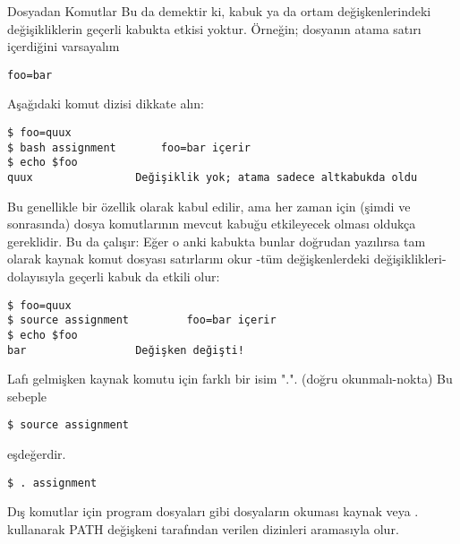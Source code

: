 \begin{section}{Dosyadan Komutlar}
Bu da demektir ki, kabuk ya da ortam değişkenlerindeki değişikliklerin geçerli kabukta etkisi yoktur. Örneğin; dosyanın atama satırı içerdiğini varsayalım
\begin{verbatim}
foo=bar
\end{verbatim}

Aşağıdaki komut dizisi dikkate alın:
\begin{verbatim}
$ foo=quux
$ bash assignment 		foo=bar içerir
$ echo $foo
quux 				Değişiklik yok; atama sadece altkabukda oldu
\end{verbatim} 

Bu genellikle bir özellik olarak kabul edilir, ama her zaman için (şimdi ve sonrasında) dosya komutlarının mevcut kabuğu etkileyecek olması oldukça gereklidir. Bu da çalışır: Eğer o anki kabukta bunlar doğrudan yazılırsa tam olarak kaynak komut dosyası satırlarını okur -tüm değişkenlerdeki değişiklikleri- dolayısıyla geçerli kabuk da etkili olur:
\begin{verbatim}
$ foo=quux
$ source assignment 		foo=bar içerir
$ echo $foo
bar 				Değişken değişti!
\end{verbatim}

Lafı gelmişken kaynak komutu için farklı bir isim ".". (doğru okunmalı-nokta) Bu sebeple
\begin{verbatim}
$ source assignment
\end{verbatim} 
eşdeğerdir.
\begin{verbatim}
$ . assignment
\end{verbatim}

Dış komutlar için program dosyaları gibi dosyaların okuması kaynak veya . kullanarak PATH değişkeni tarafından verilen dizinleri aramasıyla olur.
\end{section}
